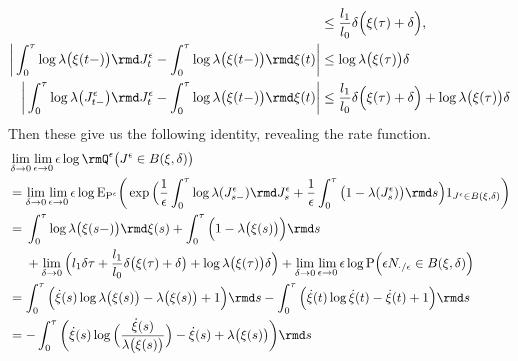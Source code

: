 \begin{example}
\begin{align*}
    &\leq \frac{\affIntPart_1}{\affIntPart_0} \delta \Big( \pathVar(\tau) + \delta \Big), \\
    \bigg| \int_0^\tau \log\affInt\big(\pathVar(t-)\big) \rmd J^\epsilon_t - \int_0^\tau \log\affInt\big(\pathVar(t-)\big) \rmd \pathVar(t)  \bigg| 
    &\leq \log\affInt\big(\pathVar(\tau)\big) \delta \\
    \bigg| \int_0^\tau \log\affInt\big(J^\epsilon_{t-}\big) \rmd J^\epsilon_t - \int_0^\tau \log\affInt\big(\pathVar(t-)\big) \rmd \pathVar(t) \bigg| 
    &\leq \frac{\affIntPart_1}{\affIntPart_0} \delta \Big( \pathVar(\tau) + \delta \Big) + \log\affInt\big(\pathVar(\tau)\big) \delta 
  \end{align*}
  Then these give us the following identity, revealing the rate function.
  \begin{align*}
    &\lim_{\delta\rightarrow0}\lim_{\epsilon\rightarrow0}\epsilon\log\mgPrb^\epsilon\big( J^\epsilon \in \ball{\pathVar}{\delta} \big) \\
    &= \lim_{\delta\rightarrow0}\lim_{\epsilon\rightarrow0} \epsilon\log\Exp_{\Prb^\epsilon}\bigg( \exp\Big(\frac1\epsilon\int_0^\tau \log\affInt(J^\epsilon_{s-}) \rmd J^\epsilon_s + \frac1\epsilon\int_0^\tau \big(1 - \affInt(J^\epsilon_s) \big) \rmd s  \Big) 1_{J^\epsilon \in \ball{\pathVar}{\delta}} \bigg) \\
    &= \begin{aligned}[t]
      & \int_0^\tau \log\affInt\big(\pathVar(s-)\big) \rmd\pathVar(s) + \int_0^\tau \Big(1 - \affInt\big(\pathVar(s)\big) \Big) \rmd s \\
      &+\lim_{\delta\rightarrow0} \Big( \affIntPart_1 \delta \tau + \frac{\affIntPart_1}{\affIntPart_0} \delta \big( \pathVar(\tau) + \delta \big) + \log\affInt\big(\pathVar(\tau)\big) \delta \Big) 
      +\lim_{\delta\rightarrow0}\lim_{\epsilon\rightarrow0} \epsilon \log \Prb\Big( \epsilon N_{\cdot/\epsilon} \in \ball{\pathVar}{\delta} \Big)
    \end{aligned} \\
    &= \int_0^\tau \Big( \dot\pathVar(s) \log \affInt\big(\pathVar(s)\big) - \affInt\big(\pathVar(s)\big) + 1 \Big) \rmd s - \int_0^\tau \Big(\dot\pathVar(t) \log \dot\pathVar(t) - \dot\pathVar(t) + 1 \Big) \rmd s \\
    &= -\int_0^\tau \bigg( \dot\pathVar(s) \log\Big(\frac{\dot\pathVar(s)}{\affInt\big(\pathVar(s)\big)} \Big) - \dot\pathVar(s) + \affInt\big(\pathVar(s)\big) \bigg) \rmd s
  \end{align*}


\end{example}
